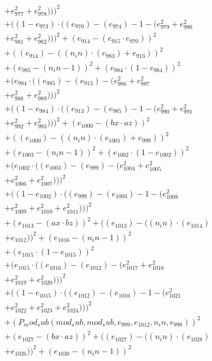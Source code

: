 \documentclass[10pt, a4paper]{article}
\begin{document}
\begin{small}
\begin{align*}
& + e_{977}^{2} + e_{978}^{2})))^{2} \\
& + ((1 - e_{973})  \cdot  ((e_{970}) - (e_{974}) - 1 - (e_{979}^{2} + e_{980}^{2} \\
& + e_{981}^{2} + e_{982}^{2})))^{2} + (e_{914} - (e_{915}  \cdot  e_{970}))^{2} \\
& + ((e_{914}) - ((n_in)  \cdot  (e_{983}) + e_{913}))^{2} \\
& + (e_{985} - (n_in - 1))^{2} + (e_{984}  \cdot  (1 - e_{984}))^{2} \\
& + (e_{984}  \cdot  ((e_{985}) - (e_{913}) - (e_{986}^{2} + e_{987}^{2} \\
& + e_{988}^{2} + e_{989}^{2})))^{2} \\
& + ((1 - e_{984})  \cdot  ((e_{913}) - (e_{985}) - 1 - (e_{990}^{2} + e_{991}^{2} \\
& + e_{992}^{2} + e_{993}^{2})))^{2} + (e_{1000} - (bx  \cdot  az))^{2} \\
& + ((e_{1000}) - ((n_in)  \cdot  (e_{1001}) + e_{999}))^{2} \\
& + (e_{1003} - (n_in - 1))^{2} + (e_{1002}  \cdot  (1 - e_{1002}))^{2} \\
& + (e_{1002}  \cdot  ((e_{1003}) - (e_{999}) - (e_{1004}^{2} + e_{1005}^{2} \\
& + e_{1006}^{2} + e_{1007}^{2})))^{2} \\
& + ((1 - e_{1002})  \cdot  ((e_{999}) - (e_{1003}) - 1 - (e_{1008}^{2} \\
& + e_{1009}^{2} + e_{1010}^{2} + e_{1011}^{2})))^{2} \\
& + (e_{1013} - (ax  \cdot  bz))^{2} + ((e_{1013}) - ((n_in)  \cdot  (e_{1014}) \\
& + e_{1012}))^{2} + (e_{1016} - (n_in - 1))^{2} \\
& + (e_{1015}  \cdot  (1 - e_{1015}))^{2} \\
& + (e_{1015}  \cdot  ((e_{1016}) - (e_{1012}) - (e_{1017}^{2} + e_{1018}^{2} \\
& + e_{1019}^{2} + e_{1020}^{2})))^{2} \\
& + ((1 - e_{1015})  \cdot  ((e_{1012}) - (e_{1016}) - 1 - (e_{1021}^{2} \\
& + e_{1022}^{2} + e_{1023}^{2} + e_{1024}^{2})))^{2} \\
& + (P_mod_sub(mod_sub, mod_sub, e_{999}, e_{1012}, n_in, e_{998}))^{2} \\
& + (e_{1027} - (bx  \cdot  az))^{2} + ((e_{1027}) - ((n_in)  \cdot  (e_{1028}) \\
& + e_{1026}))^{2} + (e_{1030} - (n_in - 1))^{2} \\

\end{align*}
\end{small}
\end{document}
